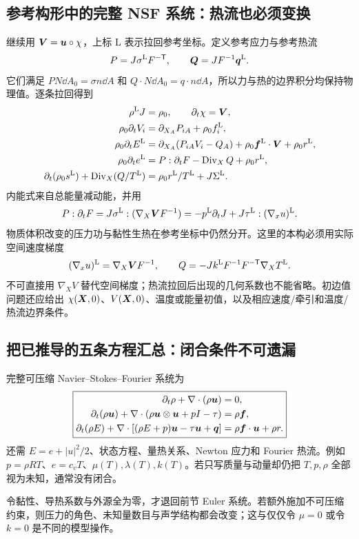 \subsection{参考构形中的完整 NSF 系统：热流也必须变换}

继续用 $\bm{V}=\bm{u}\circ\chi$，上标 L 表示拉回参考坐标。定义参考应力与参考热流
\begin{equation}
 P=J\sigma^{\mathrm L}F^{-\mathsf T},\qquad
 \bm{Q}=JF^{-1}\bm{q}^{\mathrm L}.
\end{equation}
它们满足 $P N\dd A_0=\sigma n\dd A$ 和 $Q\cdot N\dd A_0=q\cdot n\dd A$，所以力与热的边界积分均保持物理值。逐条拉回得到
\begin{align}
 \rho^{\mathrm L}J&=\rho_0,\qquad\partial_t\chi=\bm{V},\label{eq:ns-reference-mass}\\
 \rho_0\partial_tV_i&=\partial_{X_A}P_{iA}+\rho_0 f_i^{\mathrm L},\label{eq:ns-reference-momentum}\\
 \rho_0\partial_t E^{\mathrm L}
 &=\partial_{X_A}(P_{iA}V_i-Q_A)
 +\rho_0\bm{f}^{\mathrm L}\cdot\bm{V}+\rho_0 r^{\mathrm L},\label{eq:ns-reference-total}\\
 \rho_0\partial_te^{\mathrm L}&=P:\partial_tF-\operatorname{Div}_XQ+\rho_0r^{\mathrm L},\label{eq:ns-reference-internal}\\
 \partial_t(\rho_0s^{\mathrm L})+\operatorname{Div}_X(Q/T^{\mathrm L})
 &=\rho_0r^{\mathrm L}/T^{\mathrm L}+J\Sigma^{\mathrm L}.
 \label{eq:ns-reference-entropy}
\end{align}
内能式来自总能量减动能，并用
\begin{equation}
 P:\partial_tF=J\sigma^{\mathrm L}:
 (\nabla_X\bm{V} F^{-1})
 =-p^{\mathrm L}\partial_tJ+J\tau^{\mathrm L}:(\nabla_xu)^{\mathrm L}.
\end{equation}
物质体积改变的压力功与黏性生热在参考坐标中仍然分开。这里的本构必须用实际空间速度梯度
\begin{equation}
 (\nabla_xu)^{\mathrm L}=\nabla_X\bm{V} F^{-1},\qquad
 Q=-Jk^{\mathrm L}F^{-1}F^{-\mathsf T}\nabla_XT^{\mathrm L}.
\end{equation}
不可直接用 $\nabla_XV$ 替代空间梯度；热流拉回后出现的几何系数也不能省略。初边值问题还应给出 $\chi(\bm{X},0)$、$V(\bm{X},0)$、温度或能量初值，以及相应速度/牵引和温度/热流边界条件。

\subsection{把已推导的五条方程汇总：闭合条件不可遗漏}

完整可压缩 Navier--Stokes--Fourier 系统为
\begin{equation}
 \boxed{\begin{aligned}
 \partial_t\rho+\nabla\cdot(\rho\bm{u})&=0,\\
 \partial_t(\rho\bm{u})+\nabla\cdot(\rho\bm{u}\otimes\bm{u}+pI-\tau)&=\rho\bm{f},\\
 \partial_t(\rho E)+\nabla\cdot[(\rho E+p)\bm{u}-\tau\bm{u}+\bm{q}]
 &=\rho\bm{f}\cdot\bm{u}+\rho r.
 \end{aligned}}\label{eq:cnsf}
\end{equation}
还需 $E=e+|u|^2/2$、状态方程、量热关系、Newton 应力和 Fourier 热流。例如 $p=\rho RT$、$e=c_vT$、$\mu(T),\lambda(T),k(T)$。若只写质量与动量却仍把 $T,p,\rho$ 全部视为未知，通常没有闭合。

令黏性、导热系数与外源全为零，才退回前节 Euler 系统。若额外施加不可压缩约束，则压力的角色、未知量数目与声学结构都会改变；这与仅仅令 $\mu=0$ 或令 $k=0$ 是不同的模型操作。
